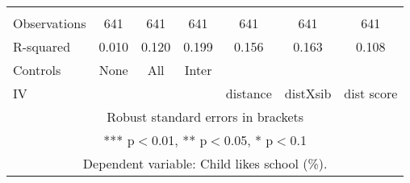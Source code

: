 \begin{tabular}{lcccccc}
 &  &  &  &  &  &  \\
Observations & 641 & 641 & 641 & 641 & 641 & 641 \\
R-squared & 0.010 & 0.120 & 0.199 & 0.156 & 0.163 & 0.108 \\
Controls & None & All & Inter &  &  &  \\
 IV &  &  &  & distance & distXsib & dist score \\ \hline
\multicolumn{7}{c}{ Robust standard errors in brackets} \\
\multicolumn{7}{c}{ *** p$<$0.01, ** p$<$0.05, * p$<$0.1} \\
\multicolumn{7}{c}{ Dependent variable: Child likes school (\%).} \\
\end{tabular}
